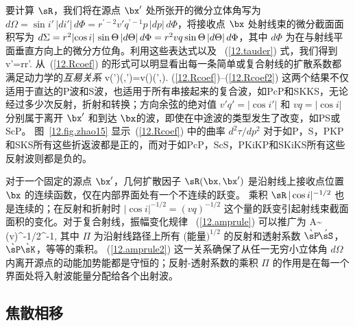 要计算 $\sR$，我们将在源点 $\bx'$ 处所张开的微分立体角写为
$d\Omega=\sin i'\,|di'|\,d\Phi=
r^{\prime -2}v'q^{\prime -1}p\,|dp|\, d\Phi$，将接收点 $\bx$ 处射线束的微分截面面积写为
$d\/\Sigma=r^2|\!\cos i|\,\sin\Theta\,|d\Theta|\,d\Phi=
r^2vq\sin\Theta\,|d\Theta|\,d\Phi$，其中
$d\Phi$ 为在与射线平面垂直方向上的微分方位角。利用这些表达式以及
~(\ref{12.tauder}) 式，我们得到
\eq \label{12.Rcoef}
v'\sR=rr'.
\en
从~(\ref{12.Rcoef}) 的形式可以明显看出每一条简单或复合射线的扩散系数都满足动力学的{\em 互易关系\/}
%
\eq \label{12.Rcoef2}
v(\bx')\sR(\bx,\bx')=v(\bx)\sR(\bx',\bx).
\en
(\ref{12.Rcoef})--(\ref{12.Rcoef2}) 这两个结果不仅适用于直达的P波和S波，也适用于所有串接起来的复合波，如PcP和SKKS，无论经过多少次反射，折射和转换；方向余弦的绝对值 
$v'q'=|\!\cos i'|$ 和 $vq=|\!\cos i|$ 分别属于离开
$\bx'$ 和到达 $\bx$的波，即使在中途波的类型发生了改变，如PS或ScP。
图~\ref{12.fig.zhao15} 显示~(\ref{12.Rcoef}) 中的曲率
$d^2\tau/dp^2$ 对于如P，S，PKP和SKS所有这些折返波都是正的，而对于如PcP，ScS，PKiKP和SKiKS所有这些反射波则都是负的。

对于一个固定的源点 $\bx'$，几何扩散因子
$\sR(\bx,\bx')$ 是沿射线上接收点位置 $\bx$ 的连续函数，仅在内部界面处有一个不连续的跃变。
乘积 $\sR\,|\cos i|^{-1/2}$ 也是连续的；在反射和折射时
$|\cos i|^{-1/2}=(vq)^{-1/2}$ 这个量的跃变引起射线束截面面积的变化。对于复合射线，振幅变化规律
~(\ref{12.amprule}) 可以推广为
\eq \label{12.amprule2}
A\sim(\rho v)^{-1/2}\Pi\sR^{-1},
\en
其中 $\Pi$ 为沿射线路径上所有 (能量$)^{1/2}$
的反射和透射系数
$\grave{\sP}\hspace{-0.3 mm}\acute{\sS}$，
$\grave{\sP}\hspace{-0.1 mm}\grave{\sK}$，等等的乘积。
(\ref{12.amprule2}) 这一关系确保了从任一无穷小立体角
$d\Omega$ 内离开源点的动能加势能都是守恒的；反射-透射系数的乘积 $\Pi$ 的作用是在每一个界面处将入射波能量分配给各个出射波。
%

\subsection{焦散相移}
%
%

